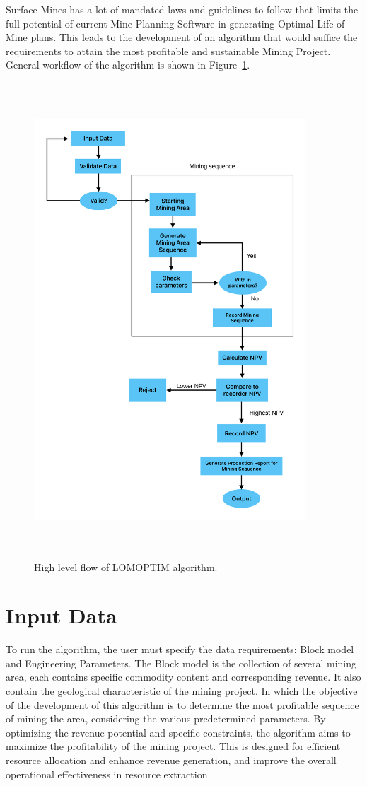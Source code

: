\documentclass[12pt]{report}
\begin{document}
Surface Mines has a lot of mandated laws and guidelines to follow that limits the full potential of current Mine Planning Software in generating Optimal Life of Mine plans.
This leads to the development of an algorithm that would suffice the requirements to attain the most profitable and sustainable Mining Project.
General workflow of the algorithm is shown in Figure~\ref{fig:PFLomoptim}.

\begin{figure}[p]
    \centering
    \includegraphics[width=4in,height=7in]{img/PFLomoptim.pdf}
    \caption{High level flow of LOMOPTIM algorithm.}
    \label{fig:PFLomoptim}
\end{figure}

\section{Input Data}

To run the algorithm, the user must specify the data requirements: Block model and Engineering Parameters.
The Block model is the collection of several mining area, each contains specific commodity content and corresponding revenue.
It also contain the geological characteristic of the mining project. In which the objective of the development of this algorithm is to determine the most profitable sequence of mining the area, considering the various predetermined parameters. By optimizing the revenue potential and specific constraints, the algorithm aims to maximize the profitability of the mining project.
This is designed for efficient resource allocation and enhance revenue generation, and improve the overall operational effectiveness in resource extraction.
\end{document}

